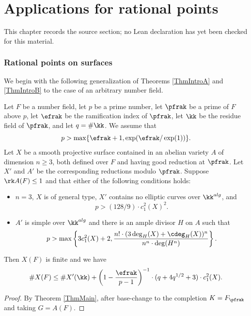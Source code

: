 \chapter{Applications for rational points}
\label{chabauty-coleman-bound-surfaces-chapter-10}

\begin{remark}
\label{chabauty-coleman-bound-surfaces-chapter-10-source}
This chapter records the source section; no Lean declaration has yet been checked for this material.
\notready
\end{remark}

\label{SecApplications}



\subsection{Rational points on surfaces} \label{SecApp1} We begin with the following generalization of Theorems \ref{ThmIntroA} and \ref{ThmIntroB} to the case of an arbitrary number field.


\begin{theorem}
\notready\label{ThmFinalMain} Let $F$ be a number field, let $p$ be a prime number, let $\pfrak$ be a prime of $F$ above $p$, let $\efrak$ be the ramification index of $\pfrak$, let $\kk$ be the residue field of $\pfrak$, and let $q=\#\kk$. We assume that
$$
p>\max\{\efrak+1, \exp(\efrak/\exp(1))\}.
$$
Let $X$ be a smooth projective surface contained in an abelian variety $A$ of dimension $n\ge 3$, both defined over $F$ and having good reduction at $\pfrak$. Let $X'$ and $A'$ be the corresponding reductions modulo $\pfrak$. Suppose  $\rk A(F)\le 1$ and that either of the following conditions holds:
\begin{itemize}
\item[(i)] $n=3$, $X$ is of general type, $X'$ contains no elliptic curves over $\kk^{alg}$, and
$$
p> (128/9)\cdot c_1^2(X)^2.
$$
\item[(ii)] $A'$ is simple over $\kk^{alg}$ and there is an ample divisor $H$ on $A$ such that
$$
p> \max\left\{3 c_1^2(X)+2,\frac{n!\cdot (3\deg_H(X) + \cdeg_H(X))^n}{n^n\cdot \deg(H^n)}\right\}.
$$
\end{itemize}
Then $X(F)$ is finite and we have
$$
\# X(F) \le \# X'(\kk) + \left(1-\frac{\efrak}{p-1}\right)^{-1}\cdot (q+4q^{1/2}+3)\cdot c_1^2(X).
$$
\end{theorem}
\begin{proof} By Theorem \ref{ThmMain}, after base-change to the completion $K=F_\pfrak$ and taking $G=A(F)$.
\end{proof}



